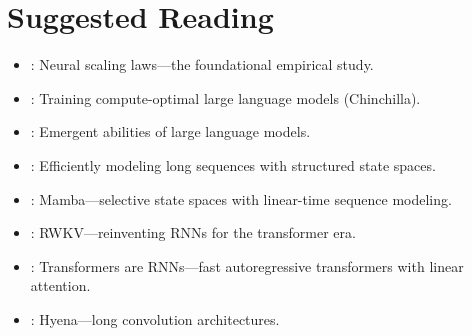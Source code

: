 \section*{Suggested Reading}
\begin{itemize}[leftmargin=1.5em]
  \item \citet{kaplan2020}: Neural scaling laws---the foundational empirical study.
  \item \citet{hoffmann2022}: Training compute-optimal large language models (Chinchilla).
  \item \citet{wei2022}: Emergent abilities of large language models.
  \item \citet{gu2022s4}: Efficiently modeling long sequences with structured state spaces.
  \item \citet{gu2023mamba}: Mamba---selective state spaces with linear-time sequence modeling.
  \item \citet{peng2023}: RWKV---reinventing RNNs for the transformer era.
  \item \citet{katharopoulos2020}: Transformers are RNNs---fast autoregressive transformers with linear attention.
  \item \citet{poli2023hyena}: Hyena---long convolution architectures.
\end{itemize}

